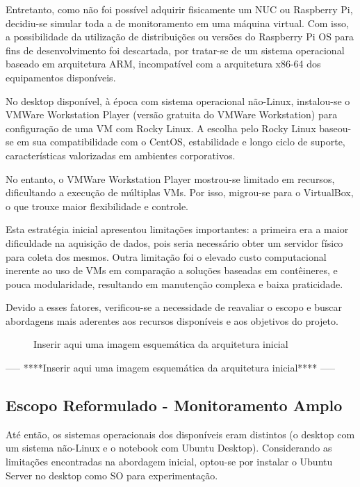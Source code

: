 Entretanto, como não foi possível adquirir fisicamente um NUC ou Raspberry Pi, decidiu-se simular toda a  de monitoramento em uma máquina virtual. Com isso, a possibilidade da utilização de distribuições ou versões do Raspberry Pi OS para fins de desenvolvimento foi descartada, por tratar-se de um sistema operacional baseado em arquitetura ARM, incompatível com a arquitetura x86-64 dos equipamentos disponíveis.

No desktop disponível, à época com sistema operacional não-Linux, instalou-se o VMWare Workstation Player (versão gratuita do VMWare Workstation) para configuração de uma VM com Rocky Linux. A escolha pelo Rocky Linux baseou-se em sua compatibilidade com o CentOS, estabilidade e longo ciclo de suporte, características valorizadas em ambientes corporativos.

No entanto, o VMWare Workstation Player mostrou-se limitado em recursos, dificultando a execução de múltiplas VMs. Por isso, migrou-se para o VirtualBox, o que trouxe maior flexibilidade e controle.

Esta estratégia inicial apresentou limitações importantes: a primeira era a maior dificuldade na aquisição de dados, pois seria necessário obter um servidor físico para coleta dos mesmos. Outra limitação foi o elevado custo computacional inerente ao uso de VMs em comparação a soluções baseadas em contêineres, e pouca modularidade, resultando em manutenção complexa e baixa praticidade.

Devido a esses fatores, verificou-se a necessidade de reavaliar o escopo e buscar abordagens mais aderentes aos recursos disponíveis e aos objetivos do projeto.

\begin{figure}[H]
\centering
\fbox{\rule{0pt}{150pt} \rule{200pt}{0pt}} %
\caption{Inserir aqui uma imagem esquemática da arquitetura inicial}
\label{fig:placeholder}
\end{figure}

-----
****Inserir aqui uma imagem esquemática da arquitetura inicial****
-----

\subsection{Escopo Reformulado - Monitoramento Amplo}
\label{subsection:EscopoReformulado}

Até então, os sistemas operacionais dos  disponíveis eram distintos (o desktop com um sistema não-Linux e o notebook com Ubuntu Desktop). Considerando as limitações encontradas na abordagem inicial, optou-se por instalar o Ubuntu Server no desktop como SO para experimentação.


